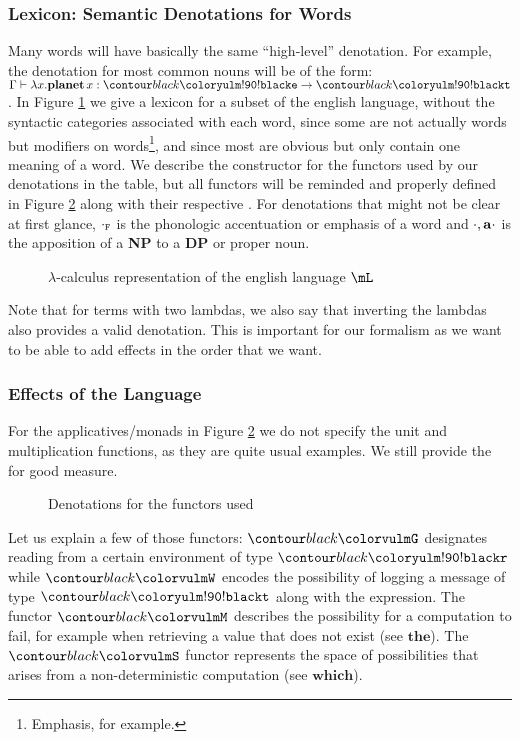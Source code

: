 \subsubsection{Lexicon: Semantic Denotations for Words}\label{subsec:lexicon}
Many words will have basically the same ``high-level'' denotation.
For example, the denotation for most common nouns will be of the form:
$\cont \lambda x. \w{planet} x: \e \to \t$.
In Figure \ref{fig:lexicon} we give a lexicon for a subset of the english
language, without the syntactic categories associated with each word, since
some are not actually words but modifiers on words\footnote{Emphasis,
	for example.}, and since most are obvious but only contain one meaning of a
word.
We describe the constructor for the functors used by our denotations in the
table, but all functors will be reminded and properly defined in Figure
\ref{fig:functors} along with their respective \fmap.
For denotations that might not be clear at first glance, $\cdot_{\tt F}$ is the
phonologic accentuation or emphasis of a word and ${\cdot, \bf a \cdot}$ is the
apposition of a \textbf{NP} to a \textbf{DP} or proper noun.
\begin{figure}
	\centering
	\caption{$\lambda$-calculus representation of the english language $\mL$}
	\label{fig:lexicon}
\end{figure}
Note that for terms with two lambdas, we also say that inverting the lambdas also provides a valid denotation.
This is important for our formalism as we want to be able to add effects in the order that we want.

\subsubsection{Effects of the Language}\label{subsec:effects}
For the applicatives/monads in Figure \ref{fig:functors} we do not specify the unit and multiplication functions, as they are quite usual examples.
We still provide the \fmap{} for good measure.

\begin{figure}
	\centering
	\caption{Denotations for the functors used}
	\label{fig:functors}
\end{figure}

Let us explain a few of those functors: $\f G$ designates reading from a certain environment of type $\r$ while $\f W$ encodes the possibility of logging a message of type $\t$ along with the expression.
The functor $\f M$ describes the possibility for a computation to fail, for example when retrieving a value that does not exist (see $\mathbf{the}$).
The $\f S$ functor represents the space of possibilities that arises from a non-deterministic computation (see $\mathbf{which}$).

